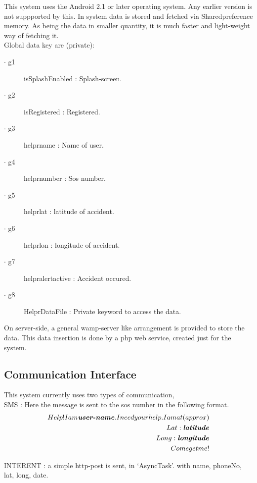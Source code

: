 This system uses the Android 2.1 or later operating system. Any earlier version is not suppported by this.
In system data is stored and fetched via Sharedpreference memory. As being the data in smaller quantity, it is much faster and light-weight way of fetching it. \\
Global data key are (private):
\begin{description}

\item[$\cdot$ g1] isSplashEnabled : Splash-screen.
\item[$\cdot$ g2] isRegistered : Registered.
\item[$\cdot$ g3] helprname : Name of user.
\item[$\cdot$ g4] helprnumber : Sos number.
\item[$\cdot$ g5] helprlat : latitude of accident.
\item[$\cdot$ g6] helprlon : longitude of accident.
\item[$\cdot$ g7] helpralertactive : Accident occured.
\item[$\cdot$ g8] HelprDataFile : Private keyword to access the data.


\end{description}
On server-side, a general wamp-server like arrangement is provided to store the data.
This data insertion is done by a php web service, created just for the system.


\subsection{Communication Interface}
\label{subsec:subsec04}
This system currently uses two types of communication, \\
SMS : Here the message is sent to the sos number in the following format.\\
\begin{align} 
Help!  I  am  \textbf{\textit{user-name}}.  I  need  your  help.  I  am  at   (approx) \\ Lat: \textbf{\textit{latitude}} \\ Long: \textbf{\textit{longitude}}  \\ Come  get  me!
\end{align}

\newpage
INTERENT : a simple http-post is sent, in `AsyncTask'. with name, phoneNo, lat, long, date.\\

